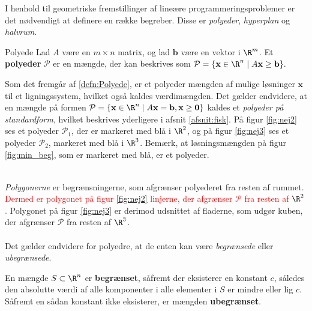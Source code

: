 I henhold til geometriske fremstillinger af lineære programmeringsproblemer er det nødvendigt at definere en række begreber.
Disse er \textit{polyeder}, \textit{hyperplan} og \textit{halvrum}.
%
\begin{defn}{}{Polyede}
Lad $A$ være en $m \times n$ matrix, og lad $\mathbf{b}$ være en vektor i  $\R^m$.
Et \textbf{polyeder} $\mathcal{P}$ er en mængde, der kan beskrives som 
$\mathcal{P} = \{\textbf{x} \in \R^n \mid A\mathbf{x}\geq \textbf{b}\}.$
%
\end{defn}
\noindent
%
Som det fremgår af \ref{defn:Polyede}, er et polyeder mængden af mulige løsninger $\mathbf{x}$ til et ligningssystem, hvilket også kaldes værdimængden.
Det gælder endvidere, at en mængde på formen $\mathcal{P} = \{\textbf{x} \in \R^n \mid A\textbf{x} = \textbf{b},\textbf{x} \geq \textbf{0} \}$ kaldes et \textit{polyeder på standardform}, hvilket beskrives yderligere i afsnit \ref{afsnit:fisk}.
%
%
På figur \ref{fig:nej2} ses et polyeder $\mathcal{P}_1$, der er markeret med blå i $\R^2$, og på figur \ref{fig:nej3} ses et polyeder $\mathcal{P}_2$, markeret med blå i $\R^3$.
Bemærk, at løsningsmængden på figur \ref{fig:min_beg}, som er markeret med blå, er et polyeder.
%
%
\begin{center}
$
\begin{array}{cc}
&

\end{array}
$
\end{center}
%
\textit{Polygonerne} er begrænsningerne, som afgrænser polyederet fra resten af rummet. 
\textcolor{red}{Dermed er polygonet på figur \ref{fig:nej2} linjerne, der afgrænser $\mathcal{P}$ fra resten af $\R^2$.}
Polygonet på figur \ref{fig:nej3} er derimod udsnittet af fladerne, som udgør kuben, der afgrænser $\mathcal{P}$ fra resten af $\R^3$.
\\\\
%
Det gælder endvidere for polyedre, at de enten kan være \textit{begrænsede} eller \textit{ubegrænsede}.
%
\begin{defn}{}{}
En mængde $S \subset \R^n$ er \textbf{begrænset}, såfremt der eksisterer en konstant $c$, således den absolutte værdi af alle komponenter i alle elementer i $S$ er mindre eller lig $c$. 
Såfremt en sådan konstant ikke eksisterer, er mængden \textbf{ubegrænset}.
\end{defn}
\noindent
% 
%
